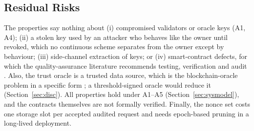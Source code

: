 \subsection{Residual Risks}\label{sec:residual}
The properties say nothing about (i) compromised validators or oracle keys (A1, A4); (ii) a stolen key used by an attacker who behaves like the owner until revoked, which no continuous scheme separates from the owner except by behaviour; (iii) side-channel extraction of keys; or (iv) smart-contract defects, for which the quality-assurance literature recommends testing, verification and audit \cite{wei2024quality}. Also, the trust oracle is a trusted data source, which is the blockchain-oracle problem in a specific form \cite{hassan2023oracle}; a threshold-signed oracle would reduce it (Section~\ref{sec:disc}). All properties hold under A1--A5 (Section~\ref{sec:sysmodel}), and the contracts themselves are not formally verified. Finally, the nonce set costs one storage slot per accepted audited request and needs epoch-based pruning in a long-lived deployment.
